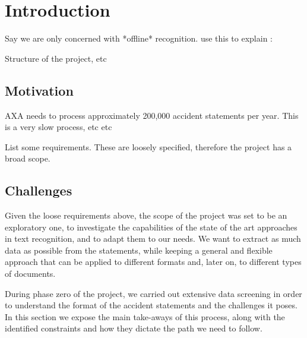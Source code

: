 
\chapter{Introduction} %

\label{ch:intro}


Say we are only concerned with *offline* recognition. use this to explain : %



Structure of the project, etc


\section{Motivation}
AXA needs to process approximately 200,000 accident statements per year. This is a very slow process, etc etc

List some requirements. These are loosely specified, therefore the project has a broad scope.

\section{Challenges}\label{sec:challenges}
Given the loose requirements above, the scope of the project was set to be an exploratory one, to investigate the capabilities of the state of the art approaches in text recognition, and to adapt them to our needs. We want to extract as much data as possible from the statements, while keeping a general and flexible approach that can be applied to different formats and, later on, to different types of documents.

During phase zero of the project, we carried out extensive data screening in order to understand the format of the accident statements and the challenges it poses. In this section we expose the main take-aways of this process, along with the identified constraints and how they dictate the path we need to follow.


